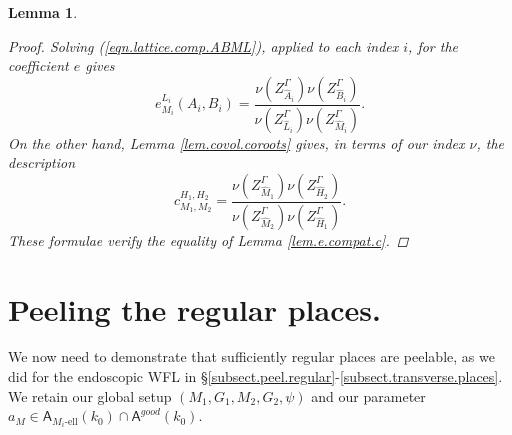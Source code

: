 \documentclass[openany]{amsbook}
\newtheorem{lemma}[theorem]{Lemma}
\theoremstyle{definition}
\theoremstyle{remark}
\numberwithin{equation}{section}
\renewcommand{\-}{\operatorname{-}}
\newcommand{\good}{\mathit{good}}
\newcommand{\el}{\text{-ell}}
\newcommand{\bA}{\mathsf{A}}
\newcommand{\bAe}[1]{\bA_{#1\el}}
\begin{document}
\begin{lemma}
\begin{proof}
        Solving (\ref{eqn.lattice.comp.ABML}), applied to each index $i$, for the coefficient $e$ gives
        $$
            e_{M_i}^{L_i}(A_i, B_i) = \frac{\nu(Z_{\widehat{A}_i}^\Gamma) \nu(Z_{\widehat{B}_i}^\Gamma)}{\nu(Z_{\widehat{L}_i}^\Gamma) \nu(Z_{\widehat{M}_i}^\Gamma)}.
        $$
        On the other hand, Lemma \ref{lem.covol.coroots} gives, in terms of our index $\nu$, the description
        $$
        c_{M_1, M_2}^{H_1, H_2} = \frac{\nu(Z^\Gamma_{\widehat{M}_1}) \nu(Z^\Gamma_{\widehat{H}_2})}{\nu(Z^\Gamma_{\widehat{M}_2}) \nu(Z^\Gamma_{\widehat{H}_1})}.
        $$
        These formulae verify the equality of Lemma \ref{lem.e.compat.c}.    
    \end{proof}
\end{lemma}







\section{Peeling the regular places.}\label{subsect.nonstd.reg.peeling}

We now need to demonstrate that sufficiently regular places are peelable, as we did for the endoscopic WFL in \S \ref{subsect.peel.regular}-\ref{subsect.transverse.places}. We retain our global setup $(M_1, G_1, M_2, G_2, \psi)$ and our parameter $a_M \in \bAe{M_i}(k_0) \cap \bA^{\good}(k_0)$. 
\end{document}
